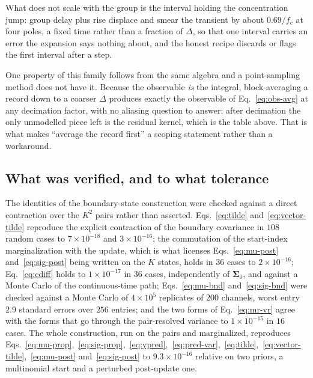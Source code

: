 \begin{appendixbox}
What does not scale with the group is the interval holding the concentration jump: group delay plus
rise displace and smear the transient by about $0.69/f_c$ at four poles, a fixed time rather than a
fraction of $\Delta$, so that one interval carries an error the expansion says nothing about, and
the honest recipe discards or flags the first interval after a step.

One property of this family follows from the same algebra and a point-sampling method does not have
it. Because the observable \emph{is} the integral, block-averaging a record down to a coarser
$\Delta$ produces exactly the observable of Eq.~\ref{eq:obs-avg} at any decimation factor, with no
aliasing question to answer; after decimation the only unmodelled piece left is the residual kernel,
which is the table above. That is what makes ``average the record first'' a scoping statement rather
than a workaround.

\subsection*{What was verified, and to what tolerance}

 The identities of the boundary-state construction were checked
against a direct contraction over the $K^2$ pairs rather than asserted. Eqs.~\ref{eq:tilde}
and~\ref{eq:vector-tilde} reproduce the explicit contraction of the boundary covariance in $108$
random cases to $7\times10^{-18}$ and $3\times10^{-16}$; the commutation of the start-index
marginalization with the update, which is what licenses Eqs.~\ref{eq:mu-post}
and~\ref{eq:sig-post} being written on the $K$ states, holds in $36$ cases to $2\times10^{-16}$;
Eq.~\ref{eq:cdiff} holds to $1\times10^{-17}$ in $36$ cases, independently of $\boldsymbol{\Sigma}_0$, and
against a Monte Carlo of the continuous-time path; Eqs.~\ref{eq:mu-bnd} and~\ref{eq:sig-bnd} were
checked against a Monte Carlo of $4\times10^{5}$ replicates of $200$ channels, worst entry $2.9$
standard errors over $256$ entries; and the two forms of Eq.~\ref{eq:mr-vr} agree with the forms
that go through the pair-resolved variance to $1\times10^{-15}$ in $16$ cases. The whole
construction, run on the pairs and marginalized, reproduces
Eqs.~\ref{eq:mu-prop},~\ref{eq:sig-prop},~\ref{eq:ypred},~\ref{eq:pred-var},~\ref{eq:tilde},~\ref{eq:vector-tilde},~\ref{eq:mu-post}
and~\ref{eq:sig-post} to $9.3\times10^{-16}$ relative on two priors, a multinomial start and a
perturbed post-update one.

\end{appendixbox}
